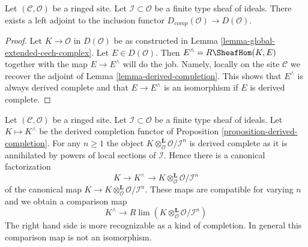 \begin{proposition}
\label{proposition-derived-completion}
Let $(\mathcal{C}, \mathcal{O})$ be a ringed site.
Let $\mathcal{I} \subset \mathcal{O}$ be a finite type sheaf of
ideals. There exists a left adjoint to the inclusion
functor $D_{comp}(\mathcal{O}) \to D(\mathcal{O})$.
\end{proposition}

\begin{proof}
Let $K \to \mathcal{O}$ in $D(\mathcal{O})$ be as constructed in
Lemma \ref{lemma-global-extended-cech-complex}. Let $E \in D(\mathcal{O})$.
Then $E^\wedge = R\SheafHom(K, E)$ together with the map $E \to E^\wedge$
will do the job. Namely, locally on the site $\mathcal{C}$ we
recover the adjoint of Lemma \ref{lemma-derived-completion}.
This shows that $E^\wedge$ is always derived complete and that
$E \to E^\wedge$ is an isomorphism if $E$ is derived complete.
\end{proof}

\begin{remark}
\label{remark-compare-with-completion}
Let $(\mathcal{C}, \mathcal{O})$ be a ringed site.
Let $\mathcal{I} \subset \mathcal{O}$ be a finite type sheaf of
ideals. Let $K \mapsto K^\wedge$ be the derived completion functor
of Proposition \ref{proposition-derived-completion}.
For any $n \geq 1$ the object
$K \otimes_\mathcal{O}^\mathbf{L} \mathcal{O}/\mathcal{I}^n$
is derived complete as it is annihilated by powers of
local sections of $\mathcal{I}$. Hence there is a canonical factorization
$$
K \to K^\wedge \to K \otimes_\mathcal{O}^\mathbf{L} \mathcal{O}/\mathcal{I}^n
$$
of the canonical map
$K \to K \otimes_\mathcal{O}^\mathbf{L} \mathcal{O}/\mathcal{I}^n$.
These maps are compatible for varying $n$ and we obtain a comparison map
$$
K^\wedge
\longrightarrow
R\lim \left(K \otimes_\mathcal{O}^\mathbf{L} \mathcal{O}/\mathcal{I}^n\right)
$$
The right hand side is more recognizable as a kind of completion.
In general this comparison map is not an isomorphism.
\end{remark}

